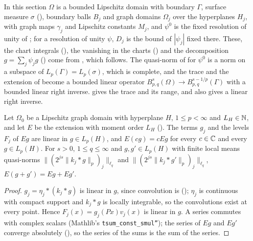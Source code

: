 In this section $\Omega$ is a bounded Lipschitz domain with boundary $\Gamma$, surface measure
$\sigma$ (), boundary balls $B_j$ and graph domains $\Omega_j$ over the
hyperplanes $H_j$, with graph maps $\gamma_j$ and Lipschitz constants $M_j$, and $\psi^0$ is the
fixed resolution of unity of ; for a resolution of unity $\psi$,
$D_j$ is the bound of $|\psi_j|$ fixed there. These, the chart integrals
(), the vanishing in the charts
() and the decomposition $g = \sum_j \psi_j g$
() come from , which follows. The
quasi-norm of
 for $\psi^0$ is a norm on a subspace of
$L_p(\Gamma) = L_p(\sigma)$, which is complete, and the trace and the extension of
 become a bounded linear operator
$B^s_{p,q}(\Omega) \to B^{s - 1/p}_{p,q}(\Gamma)$ with a bounded linear right inverse.
\cite[Theorem 4.11]{SchneiderVybiral} gives the trace and its range, and
\cite[Theorem 1.1.3(i)]{Mayboroda2005} also gives a linear right inverse.

\begin{lemma}
\label{lem:graph-extension-linear}
\leanok
{}
Let $\Omega_0$ be a Lipschitz graph domain with hyperplane $H$, $1 \leq p < \infty$ and $L_H \in
\mathbb{N}$, and let $E$ be the extension with moment order $L_H$ (). The
terms $g_j$ and the levels $F_j$ of $E g$ are linear in $g \in L_p(H)$, and $E(c g) = c E g$ for
every $c \in \mathbb{C}$ and every $g \in L_p(H)$. For $s > 0$, $1 \leq q \leq \infty$ and
$g, g' \in L_p(H)$ with finite local means quasi-norms
$\|(2^{js} \|k_j * g\|_p)_j\|_{\ell_q}$ and $\|(2^{js} \|k_j * g'\|_p)_j\|_{\ell_q}$,
$E(g + g') = E g + E g'$.
\end{lemma}

\begin{proof}
\leanok
$g_j = \eta_j * (k_j * g)$ is linear in $g$, since convolution is (); $\eta_j$ is
continuous with compact support and $k_j * g$ is locally integrable, so the convolutions exist at
every point. Hence $F_j(x) = g_j(P x) v_j(x)$ is linear in $g$. A series commutes with complex
scalars (Mathlib's \texttt{tsum\_\allowbreak const\_\allowbreak smul''}); the series of $E g$ and
$E g'$ converge absolutely (), so the series of the sums is the
sum of the series.
\end{proof}


